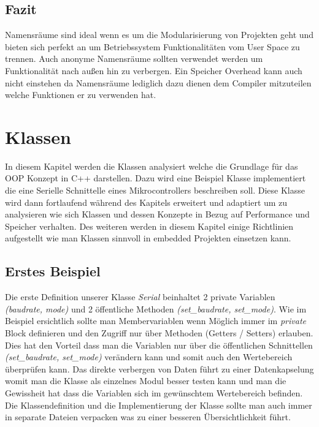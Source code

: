 \documentclass[MES,Master,ngerman]{twbook}%
\begin{document}
\subsection{Fazit}
Namensräume sind ideal wenn es um die Modularisierung von Projekten geht und bieten sich perfekt an um Betriebssystem Funktionalitäten vom User Space zu trennen. Auch anonyme Namensräume sollten verwendet werden um Funktionalität nach außen hin zu verbergen. Ein Speicher Overhead kann auch nicht einstehen da Namensräume lediglich dazu dienen dem Compiler mitzuteilen welche Funktionen er zu verwenden hat.
\newpage

\section{Klassen}
In diesem Kapitel werden die Klassen analysiert welche die Grundlage für das OOP Konzept in C++ darstellen. Dazu wird eine Beispiel Klasse implementiert die eine Serielle Schnittelle eines Mikrocontrollers beschreiben soll. Diese Klasse wird dann fortlaufend während des Kapitels erweitert und adaptiert um zu analysieren wie sich Klassen und dessen Konzepte in Bezug auf Performance und Speicher verhalten. Des weiteren werden in diesem Kapitel einige Richtlinien aufgestellt wie man Klassen sinnvoll in embedded Projekten einsetzen kann. 
\subsection{Erstes Beispiel}
Die erste Definition unserer Klasse \textit{Serial} beinhaltet 2 private Variablen \textit{(baudrate, mode)} und 2 öffentliche Methoden \textit{(set\_baudrate, set\_mode)}. Wie im Beispiel ersichtlich sollte man Membervariablen wenn Möglich immer im \textit{private} Block definieren und den Zugriff nur über Methoden (Getters / Setters) erlauben. Dies hat den Vorteil dass man die Variablen nur über die öffentlichen Schnittellen \textit{(set\_baudrate, set\_mode)} verändern kann und somit auch den Wertebereich überprüfen kann. Das direkte verbergen von Daten führt zu einer Datenkapselung womit man die Klasse als einzelnes Modul besser testen kann und man die Gewissheit hat dass die Variablen sich im gewünschtem Wertebereich befinden. Die Klassendefinition und die Implementierung der Klasse sollte man auch immer in separate Dateien verpacken was zu einer besseren Übersichtlichkeit führt. \newline 
\begin{figure}[!htb]
	\begin{subfigure}[b]{0.5\textwidth}
		
		\label{fig:19}
	\end{subfigure}
	\begin{subfigure}[b]{0.5\textwidth}
		
		\label{fig:20}
	\end{subfigure}
\end{figure}
\end{document}
